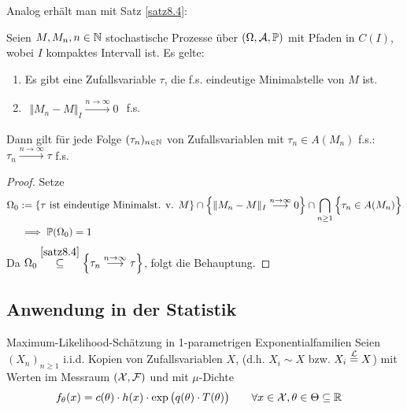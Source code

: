 Analog erhält man mit Satz \ref{satz8.4}:

\begin{satz}\label{satz8.6}
	Seien $M,M_n,n\in\N$ stochastische Prozesse über $(\Omega,\A,\P)$ mit Pfaden in $C(I)$,
	wobei $I$ kompaktes Intervall ist.
	Es gelte:
	\begin{enumerate}[label=(\arabic*)]
		\item Es gibt eine Zufallsvariable $\tau$, die f.s. eindeutige Minimalstelle von $M$ ist.
		\item $\begin{aligned}
			\Vert M_n-M\Vert_I\overset{n\to\infty}{\longrightarrow}0
		\end{aligned}$ f.s.
	\end{enumerate}
	Dann gilt für jede Folge $(\tau_n)_{n\in\N}$ von Zufallsvariablen mit $\tau_n\in A(M_n)$ f.s.:
	$\tau_n\overset{n\to\infty}{\longrightarrow}\tau$ f.s.
\end{satz}

\begin{proof}
	Setze
	\begin{align*}
		 \Omega_0&:=\lbrace\tau\text{ ist eindeutige Minimalst. v. }M\rbrace
		 \cap\Big\lbrace\Vert M_n-M\Vert_I\overset{n\to\infty}{\longrightarrow}0\Big\rbrace
		 \cap\bigcap\limits_{n\geq1}\Big\lbrace\tau_n\in A(M_n)\Big\rbrace\\
		 &\implies\P(\Omega_0)=1
	\end{align*}		
	Da $\Omega_0\overset{\ref{satz8.4}}{\subseteq}\Big\lbrace\tau_n\overset{n\to\infty}{\longrightarrow}\tau\Big\rbrace$, folgt die Behauptung.
\end{proof}

\subsection{Anwendung in der Statistik} %
Maximum-Likelihood-Schätzung in 1-parametrigen Exponentialfamilien
Seien $(X_n)_{n\geq1}$ i.i.d. Kopien von Zufallsvariablen $X$, (d.h. $X_i\sim X$ bzw. $X_i\overset{\L}{=}X$)
mit Werten im Messraum $(\X,\F)$ und mit $\mu$-Dichte 
\begin{align*}
	f_\theta(x)&=c(\theta)\cdot h(x)\cdot\exp\big(q(\theta)\cdot T(\theta)\big)
	\qquad\forall x\in\X,\theta\in\Theta\subseteq\R
\end{align*}


